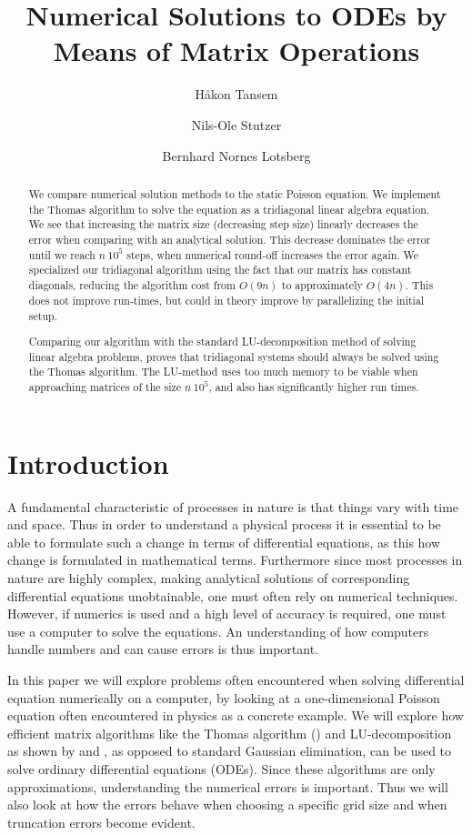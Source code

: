 \documentclass[twocolumn]{aastex62}
\begin{document}
\title{Numerical Solutions to ODEs by Means of Matrix Operations}




\author{Håkon Tansem}

\author{Nils-Ole Stutzer}

\author{Bernhard Nornes Lotsberg}

\begin{abstract}
We compare numerical solution methods to the static Poisson equation. We implement the Thomas algorithm to solve the equation as a tridiagonal linear algebra equation. We see that increasing the matrix size (decreasing step size) linearly decreases the error when comparing with an analytical solution. This decrease dominates the error until we reach $n~10^5$ steps, when numerical round-off increases the error again. We specialized our tridiagonal algorithm using the fact that our matrix has constant diagonals, reducing the algorithm cost from $O(9n)$ to approximately $O(4n)$. This does not improve run-times, but could in theory improve by parallelizing the initial setup. 

Comparing our algorithm with the standard LU-decomposition method of solving linear algebra problems, proves that tridiagonal systems should always be solved  using the Thomas algorithm. The LU-method uses too much memory to be viable when approaching matrices of the size $n~10^5$, and also has significantly higher run times.
\end{abstract}

\section{Introduction} \label{sec:intro}
A fundamental characteristic of processes in nature is that things vary with time and space. Thus in order to understand a physical process it is essential to be able to formulate such a change in terms of differential equations, as this how change is formulated in mathematical terms. Furthermore since most processes in nature are highly complex, making analytical solutions of corresponding differential equations unobtainable, one must often rely on numerical techniques. However, if numerics is used and a high level of accuracy is required, one must use a computer to solve the equations. An understanding of how computers handle numbers and can cause errors is thus important.

In this paper we will explore problems often encountered when solving differential equation numerically on a computer, by looking at a one-dimensional Poisson equation often encountered in physics as a concrete example. We will explore how efficient matrix algorithms like the Thomas algorithm (\citep[]{Jensen:2015}) and LU-decomposition as shown by \citep[p.142]{lay:2015} and \citep[p.668]{Boyd:2004}, as opposed to standard Gaussian elimination, can be used to solve ordinary differential equations (ODEs). Since these algorithms are only approximations, understanding the numerical errors is important. Thus we will also look at how the errors behave when choosing a specific grid size and when truncation errors become evident.   
 
\end{document}
